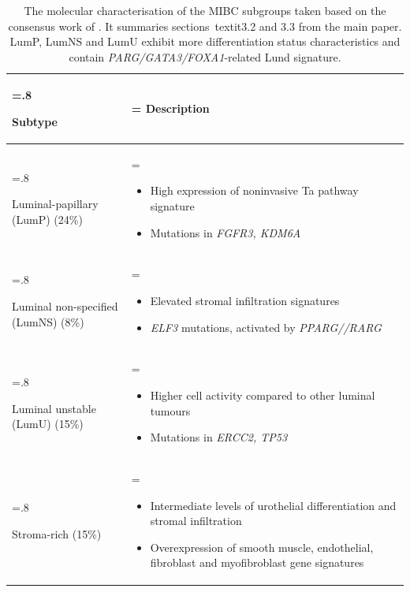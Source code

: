 \begin{table}[!htb]
\centering
\caption{The molecular characterisation of the MIBC subgroups taken based on the consensus work of \cite{Kamoun2020-tj}. It summaries sections\  textit{3.2 and 3.3} from the main paper. LumP, LumNS and LumU exhibit more differentiation status characteristics and contain \textit{PARG/GATA3/FOXA1}-related Lund signature.}
    \begin{tabularx}{\textwidth}{>{\hsize=.8\hsize\raggedright\arraybackslash}X >{\hsize=\hsize\arraybackslash}X}
    \toprule
    Subtype & Description \\
    \midrule
    Luminal-papillary (LumP) (24\%) & 
    \begin{itemize}[leftmargin=*, nosep, after=\vspace{-\baselineskip}]
        \item High expression of noninvasive Ta pathway signature
        \item Mutations in \textit{FGFR3, KDM6A}
    \end{itemize} \\
    \midrule
    Luminal non-specified (LumNS) (8\%) & 
    \begin{itemize}[leftmargin=*, nosep, after=\vspace{-\baselineskip}]
        \item Elevated stromal infiltration signatures
        \item \textit{ELF3} mutations, activated by \textit{PPARG//RARG}
    \end{itemize} \\
    \midrule
    Luminal unstable (LumU) (15\%) & 
    \begin{itemize}[leftmargin=*, nosep, after=\vspace{-\baselineskip}]
        \item Higher cell activity compared to other luminal tumours
        \item Mutations in \textit{ERCC2, TP53}
    \end{itemize} \\
    \midrule
    Stroma-rich (15\%) & 
    \begin{itemize}[leftmargin=*, nosep, after=\vspace{-\baselineskip}]
        \item Intermediate levels of urothelial differentiation and stromal infiltration
        \item Overexpression of smooth muscle, endothelial, fibroblast and myofibroblast gene signatures

\end{itemize}
\end{tabularx}
\end{table}
